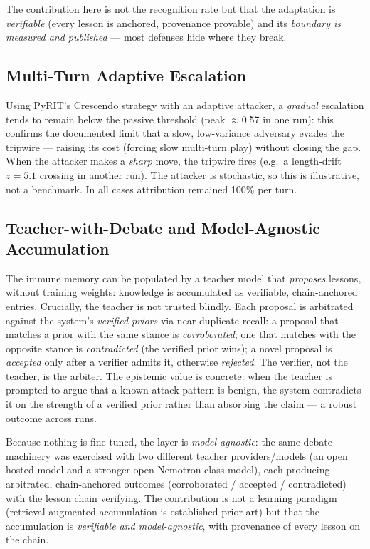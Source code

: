 \documentclass[11pt,a4paper]{article}
\begin{document}
The contribution here is not the recognition rate but that the adaptation is
\emph{verifiable} (every lesson is anchored, provenance provable) and its
\emph{boundary is measured and published} --- most defenses hide where they break.

\subsection{Multi-Turn Adaptive Escalation}

Using PyRIT's Crescendo strategy with an adaptive attacker, a \emph{gradual} escalation
tends to remain below the passive threshold (peak $\approx$0.57 in one run): this confirms
the documented limit that a slow, low-variance adversary evades the tripwire --- raising
its cost (forcing slow multi-turn play) without closing the gap. When the attacker makes a
\emph{sharp} move, the tripwire fires (e.g.\ a length-drift $z{=}5.1$ crossing in another
run). The attacker is stochastic, so this is illustrative, not a benchmark. In all cases
attribution remained 100\% per turn.

\subsection{Teacher-with-Debate and Model-Agnostic Accumulation}

The immune memory can be populated by a teacher model that \emph{proposes} lessons,
without training weights: knowledge is accumulated as verifiable, chain-anchored entries.
Crucially, the teacher is not trusted blindly. Each proposal is arbitrated against the
system's \emph{verified priors} via near-duplicate recall: a proposal that matches a prior
with the same stance is \emph{corroborated}; one that matches with the opposite stance is
\emph{contradicted} (the verified prior wins); a novel proposal is \emph{accepted} only
after a verifier admits it, otherwise \emph{rejected}. The verifier, not the teacher, is
the arbiter. The epistemic value is concrete: when the teacher is prompted to argue that a
known attack pattern is benign, the system contradicts it on the strength of a verified
prior rather than absorbing the claim --- a robust outcome across runs.

Because nothing is fine-tuned, the layer is \emph{model-agnostic}: the same debate
machinery was exercised with two different teacher providers/models (an open hosted model
and a stronger open Nemotron-class model), each producing arbitrated, chain-anchored
outcomes (corroborated / accepted / contradicted) with the lesson chain verifying. The
contribution is not a learning paradigm (retrieval-augmented accumulation is established
prior art) but that the accumulation is \emph{verifiable and model-agnostic}, with
provenance of every lesson on the chain.
\end{document}
